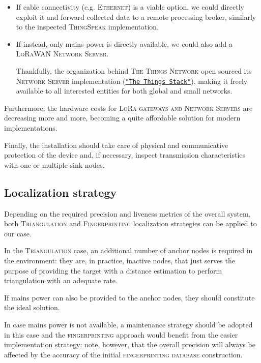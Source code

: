\documentclass[a4paper,11pt]{article} %
\begin{document}
\begin{itemize}
    \item If cable connectivity (e.g. \textsc{Ethernet}) is a viable option, we could directly exploit it and forward collected data to a remote processing broker, similarly to the inspected \textsc{ThingSpeak} implementation.
    \item If instead, only mains power is directly available, we could also add a \textsc{LoRaWAN Network Server}.

        Thankfully, the organization behind \textsc{The Things Network} open sourced its \textsc{Network Server} implementation (\href{https://github.com/TheThingsNetwork/lorawan-stack}{\texttt{"The Things Stack"}}), making it freely available to all interested entities for both global and small networks.
\end{itemize}

\smallskip

Furthermore, the hardware costs for \textsc{LoRa gateways and Network Servers} are decreasing more and more, becoming a quite affordable solution for modern implementations.

\smallskip

Finally, the installation should take care of physical and communicative protection of the device and, if necessary, inspect transmission characteristics with one or multiple sink nodes.

\subsection{Localization strategy}\label{localization-strategy}

Depending on the required precision and liveness metrics of the overall system, both \textsc{Triangulation} and \textsc{Fingerprinting} localization strategies can be applied to our case.

\medskip

In the \textsc{Triangulation} case, an additional number of anchor nodes is required in the environment: they are, in practice, inactive nodes, that just serves the purpose of providing the target with a distance estimation to perform triangulation with an adequate rate.

\smallskip

If mains power can also be provided to the anchor nodes, they should constitute the ideal solution.

\smallskip

In case mains power is not available, a maintenance strategy should be adopted in this case and the \textsc{fingerprinting} approach would benefit from the easier implementation strategy: note, however, that the overall precision will always be affected by the accuracy of the initial \textsc{fingerprinting database} construction.
\end{document}
